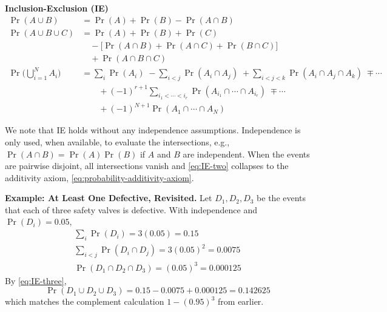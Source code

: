 \begin{definitionBox}
\textbf{Inclusion-Exclusion (IE)}
\begin{align}
    \Pr(A\cup B) &= \Pr(A)+\Pr(B)-\Pr(A\cap B) \label{eq:IE-two}\\[4pt]
    \Pr(A\cup B\cup C) &= \Pr(A)+\Pr(B)+\Pr(C) \nonumber\\
    &\quad - \big[\Pr(A\cap B)+\Pr(A\cap C)+\Pr(B\cap C)\big] \nonumber\\
    &\quad + \Pr(A\cap B\cap C) \label{eq:IE-three}\\[4pt]
    \Pr\!\Big(\bigcup_{i=1}^N A_i\Big) &= \sum_{i} \Pr(A_i)
    \;-\!\!\sum_{i<j} \Pr(A_i\cap A_j)
    \;+\!\!\sum_{i<j<k} \Pr(A_i\cap A_j\cap A_k)
    \;\mp \cdots \nonumber\\
    &\qquad + (-1)^{r+1}\!\!\!\sum_{i_1<\cdots<i_r}\!\!\! \Pr(A_{i_1}\cap\cdots\cap A_{i_r})
    \;\mp \cdots \nonumber\\
    &\qquad + (-1)^{N+1} \Pr(A_1\cap\cdots\cap A_N)\label{eq:IE-general}
\end{align}
\end{definitionBox}
We note that IE holds without any independence assumptions. Independence is only used, when available, to evaluate the intersections, e.g., $\Pr(A\cap B)=\Pr(A)\Pr(B)$ if $A$ and $B$ are independent. When the events are pairwise disjoint, all intersections vanish and \autoref{eq:IE-two} collapses to the additivity axiom, \autoref{eq:probability-additivity-axiom}.

\begin{exampleBox}
\textbf{Example: At Least One Defective, Revisited.}
Let $D_1,D_2,D_3$ be the events that each of three safety valves is defective. With independence and $\Pr(D_i)=0.05$,
\begin{gather}
    \sum_i \Pr(D_i)=3(0.05)=0.15 \\
    \sum_{i<j} \Pr(D_i\cap D_j)=3(0.05)^2=0.0075 \\
    \Pr(D_1\cap D_2\cap D_3)=(0.05)^3=0.000125
\end{gather}
By \autoref{eq:IE-three},
\begin{equation}
    \Pr(D_1\cup D_2\cup D_3)=0.15-0.0075+0.000125=0.142625
\end{equation}
which matches the complement calculation $1-(0.95)^3$ from earlier.
\end{exampleBox}

